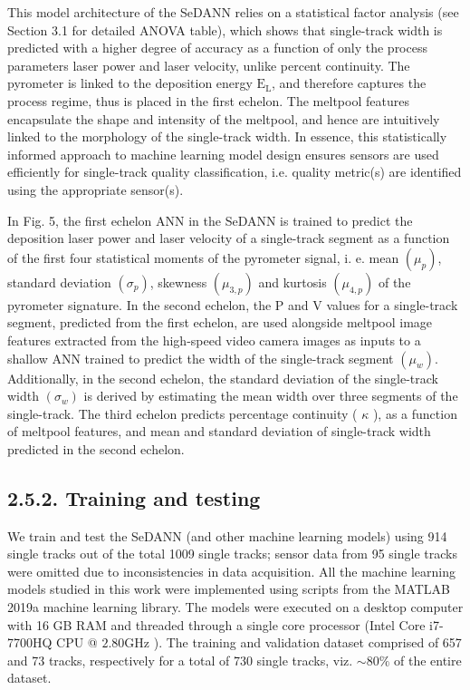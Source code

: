 \documentclass[10pt]{article}
\begin{document}
This model architecture of the SeDANN relies on a statistical factor analysis (see Section 3.1 for detailed ANOVA table), which shows that single-track width is predicted with a higher degree of accuracy as a function of only the process parameters laser power and laser velocity, unlike percent continuity. The pyrometer is linked to the deposition energy $\mathrm{E}_{\mathrm{L}}$, and therefore captures the process regime, thus is placed in the first echelon. The meltpool features encapsulate the shape and intensity of the meltpool, and hence are intuitively linked to the morphology of the single-track width. In essence, this statistically informed approach to machine learning model design ensures sensors are used efficiently for single-track quality classification, i.e. quality metric(s) are identified using the appropriate sensor(s).

In Fig. 5, the first echelon ANN in the SeDANN is trained to predict the deposition laser power and laser velocity of a single-track segment as a function of the first four statistical moments of the pyrometer signal, i. e. mean $\left(\mu_{p}\right)$, standard deviation $\left(\sigma_{p}\right)$, skewness $\left(\mu_{3, p}\right)$ and kurtosis $\left(\mu_{4, p}\right)$ of the pyrometer signature. In the second echelon, the $\mathrm{P}$ and $\mathrm{V}$ values for a single-track segment, predicted from the first echelon, are used alongside meltpool image features extracted from the high-speed video camera images as inputs to a shallow ANN trained to predict the width of the single-track segment $\left(\mu_{w}\right)$. Additionally, in the second echelon, the standard deviation of the single-track width $\left(\sigma_{w}\right)$ is derived by estimating the mean width over three segments of the single-track. The third echelon predicts percentage continuity ( $\kappa$ ), as a function of meltpool features, and mean and standard deviation of single-track width predicted in the second echelon.

\subsection*{2.5.2. Training and testing}
We train and test the SeDANN (and other machine learning models) using 914 single tracks out of the total 1009 single tracks; sensor data from 95 single tracks were omitted due to inconsistencies in data acquisition. All the machine learning models studied in this work were implemented using scripts from the MATLAB 2019a machine learning library. The models were executed on a desktop computer with 16 GB RAM and threaded through a single core processor (Intel Core i7-7700HQ CPU @ $2.80 \mathrm{GHz}$ ). The training and validation dataset comprised of 657 and 73 tracks, respectively for a total of 730 single tracks, viz. $\sim 80 \%$ of the entire dataset.
\end{document}
